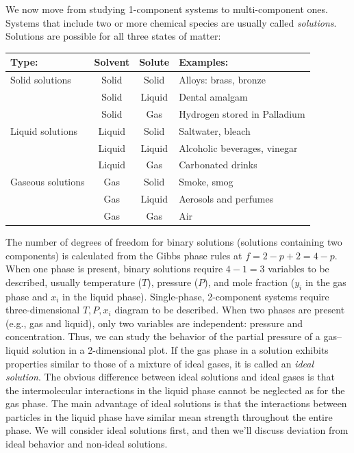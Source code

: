 \documentclass[
  9pt,
]{extbook}
\theoremstyle{definition}
\theoremstyle{definition}
\theoremstyle{definition}
\theoremstyle{remark}
\begin{document}
We now move from studying 1-component systems to multi-component ones. Systems that include two or more chemical species are usually called \emph{solutions}. Solutions are possible for all three states of matter:

\scriptsize

\begin{longtable}[]{@{}lccl@{}}
\toprule
Type: & Solvent & Solute & Examples: \\
\midrule
\endhead
Solid solutions & Solid & Solid & Alloys: brass, bronze \\
& Solid & Liquid & Dental amalgam \\
& Solid & Gas & Hydrogen stored in Palladium \\
Liquid solutions & Liquid & Solid & Saltwater, bleach \\
& Liquid & Liquid & Alcoholic beverages, vinegar \\
& Liquid & Gas & Carbonated drinks \\
Gaseous solutions & Gas & Solid & Smoke, smog \\
& Gas & Liquid & Aerosols and perfumes \\
& Gas & Gas & Air \\
\bottomrule
\end{longtable}

\normalsize

The number of degrees of freedom for binary solutions (solutions containing two components) is calculated from the Gibbs phase rules at \(f=2-p+2=4-p\). When one phase is present, binary solutions require \(4-1=3\) variables to be described, usually temperature (\(T\)), pressure (\(P\)), and mole fraction (\(y_i\) in the gas phase and \(x_i\) in the liquid phase). Single-phase, 2-component systems require three-dimensional \(T,P,x_i\) diagram to be described. When two phases are present (e.g., gas and liquid), only two variables are independent: pressure and concentration. Thus, we can study the behavior of the partial pressure of a gas--liquid solution in a 2-dimensional plot. If the gas phase in a solution exhibits properties similar to those of a mixture of ideal gases, it is called an \emph{ideal solution}. The obvious difference between ideal solutions and ideal gases is that the intermolecular interactions in the liquid phase cannot be neglected as for the gas phase. The main advantage of ideal solutions is that the interactions between particles in the liquid phase have similar mean strength throughout the entire phase. We will consider ideal solutions first, and then we'll discuss deviation from ideal behavior and non-ideal solutions.
\end{document}
